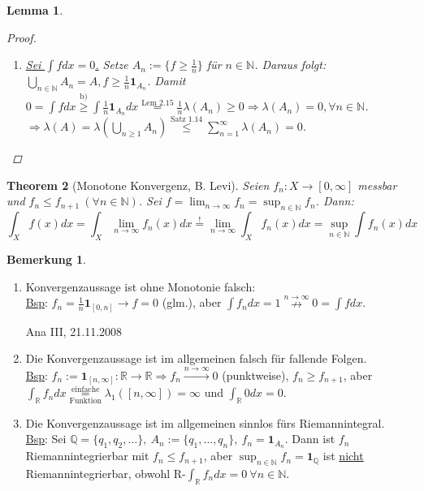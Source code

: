 \documentclass[a4paper]{report}
\newcommand{\doubleOne}{\textbf{1}}
\newcommand{\R}{\mathbb{R}}
\newcommand{\N}{\mathbb{N}}
\newcommand{\Q}{\mathbb{Q}}
\newcommand{\toInf}{\rightarrow \infty}
\newcommand{\limToInf}[1]{\lim_{#1 \toInf}}
\newcommand{\jlabel}[1]{\label{j_#1}}
\newcommand{\jshortlink}[1]{\jhyperref{#1}{\text{#1}}}
\newcommand{\jhyperref}[2]{\hyperref[j_#1]{#2}}
\newcommand{\jabb}[3]{ #1: #2 \rightarrow #3 }
\newcommand{\jspacesmall}{\vspace{4pt}}
\newcommand{\jdate}[1]{\jspacesmall\begin{center}\jlabel{#1}\tiny{Ana III, #1}\end{center}}
\theoremstyle{plain}
\newtheorem{thm}{Theorem}[chapter]
\newtheorem{lem}[thm]{Lemma}
\theoremstyle{definition}
\newtheorem*{bem*}{Bemerkung}
\begin{document}
{{{\begin{lem}
\begin{proof}
\begin{enumerate}
\begin{enumerate}
                    \item
                        \uline{Sei $\int f dx = 0$.} Setze $A_n := \{f \ge \frac{1}{n}\}$ für $n \in \N$. Daraus folgt: $\bigcup_{n \in \N} A_n = A, f \ge \frac{1}{n} \doubleOne_{A_n}$. Damit $0 = \int f dx \overset{\text{b)}}{\ge} \int \frac{1}{n} \doubleOne_{A_n} dx \overset{\jshortlink{Lem 2.15}}{=} \frac{1}{n}\lambda(A_n) \ge 0 \Rightarrow \lambda(A_n) = 0, \forall n \in \N$.\\
                        $\Rightarrow \lambda(A) = \lambda(\bigcup_{n \ge 1} A_n) \overset{\jshortlink{Satz 1.14}}{\le} \sum_{n=1}^\infty \lambda(A_n) = 0$.
                \end{enumerate}
        \end{enumerate}
    \end{proof}
\end{lem}


\begin{thm}[Monotone Konvergenz, B. Levi]
\jlabel{Thm 2.19}
\jlabel{BL}
    Seien $f_n:X \rightarrow [0, \infty]$ messbar und $f_n \le f_{n+1} \ (\forall n \in \N)$. Sei $f= \limToInf{n} f_n = \sup_{n \in \N} f_n$. Dann:
    \begin{displaymath}
        \int_X f(x)dx = \int_X \limToInf{n} f_n(x)dx \overset{!}{=} \limToInf{n} \int_X f_n(x)dx = \sup_{n\in\N} \int f_n(x)dx
    \end{displaymath}
\end{thm}

\begin{bem*}
    \begin{enumerate}
        \item Konvergenzaussage ist ohne Monotonie falsch:\\
            \uline{Bsp}: $f_n = \frac{1}{n} \doubleOne_{[0,n]} \rightarrow f = 0$ (glm.), aber $\int f_n dx = 1 \overset{n \toInf}{\nrightarrow} 0 = \int f dx$.
            
\jdate{21.11.2008}
            
        \item Die Konvergenzaussage ist im allgemeinen falsch für fallende Folgen.\\
            \uline{Bsp}: $f_n:=\jabb{\doubleOne_{[n,\infty]}}{\R}{\R} \Rightarrow f_n\xrightarrow{n\rightarrow \infty} 0$ (punktweise), $f_n \ge f_{n+1}$, aber $\int_\R f_n dx \overset{\text{einfache}}{\underset{\text{Funktion}}{=}} \lambda_1([n,\infty]) = \infty$ und $\int_\R 0 dx = 0$.
        \item Die Konvergenzaussage ist im allgemeinen sinnlos fürs Riemannintegral.\\
            \uline{Bsp}: Sei $\Q = \{q_1, q_2, \dots\},\ A_n:= \{q_1,\dots,q_n\},\ f_n = \doubleOne_{A_n}$. Dann ist $f_n$ Riemannintegrierbar mit $f_n \le f_{n+1}$, aber $\sup_{n\in\N} f_n = \doubleOne_\Q$ ist \uline{nicht} Riemannintegrierbar, obwohl R-$\int_\R f_n dx = 0 \ \forall n\in\N$.
    \end{enumerate}
\end{bem*}

}}}
\end{document}
